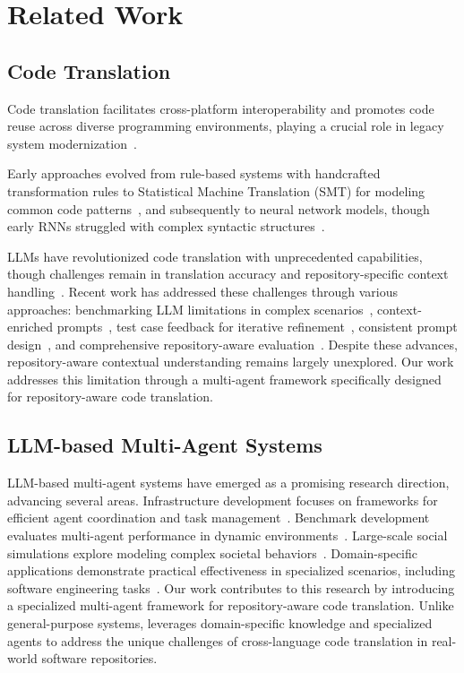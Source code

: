 \section{Related Work}
\label{sec:related}

\subsection{Code Translation}
Code translation facilitates cross-platform interoperability and promotes code reuse across diverse programming environments, playing a crucial role in legacy system modernization~\cite{lu2021codexglue,puri2021codenet}.

Early approaches evolved from rule-based systems with handcrafted transformation rules to Statistical Machine Translation (SMT) for modeling common code patterns~\cite{nguyen2013lexical,chen2018tree}, and subsequently to neural network models, though early RNNs struggled with complex syntactic structures~\cite{dong2016language,yin2017syntactic,yin2018tranx}.

LLMs have revolutionized code translation with unprecedented capabilities, though challenges remain in translation accuracy and repository-specific context handling~\cite{zhu2022xlcost,rithy2022xtest}.
Recent work has addressed these challenges through various approaches: benchmarking LLM limitations in complex scenarios~\cite{jiao2023evaluation}, context-enriched prompts~\cite{pan2024lost}, test case feedback for iterative refinement~\cite{yang2024exploring}, consistent prompt design~\cite{macedo2024exploring}, and comprehensive repository-aware evaluation~\cite{ou2024repository}. Despite these advances, repository-aware contextual understanding remains largely unexplored. Our work addresses this limitation through a multi-agent framework specifically designed for repository-aware code translation.

\subsection{LLM-based Multi-Agent Systems}
LLM-based multi-agent systems have emerged as a promising research direction, advancing several areas. 
Infrastructure development focuses on frameworks for efficient agent coordination and task management~\cite{gong2023mindagent,chen2023agentverse,zhang2023building,hong2023metagpt,zhang2024proagent}. 
Benchmark development evaluates multi-agent performance in dynamic environments~\cite{chen2024llmarena,dong2024villageragent}. 
Large-scale social simulations explore modeling complex societal behaviors~\cite{al2024project,li2022evolution,de2004epidemiology}. 
Domain-specific applications demonstrate practical effectiveness in specialized scenarios, including software engineering tasks~\cite{d2024marg,zhang2024autocoderover,yang2024swe}.
Our work contributes to this research by introducing a specialized multi-agent framework for repository-aware code translation. Unlike general-purpose systems, \toolname leverages domain-specific knowledge and specialized agents to address the unique challenges of cross-language code translation in real-world software repositories.